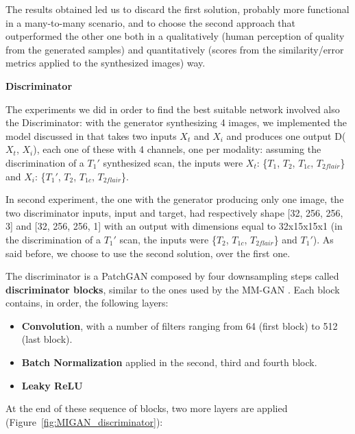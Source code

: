 \vspace{5mm} %
The results obtained led us to discard the first solution, probably more functional in a many-to-many scenario, and to choose the second approach that outperformed the other one both in a qualitatively (human perception of quality from the generated samples) and quantitatively (scores from the similarity/error metrics applied to the synthesized images) way.

\vspace{6mm} 
\noindent\textbf{Discriminator}

\vspace{2mm}
\noindent The experiments we did in order to find the best suitable network involved also the Discriminator: with the generator synthesizing 4 images, we implemented the model discussed in \cite{migan} that takes two inputs $X_t$ and $X_i$ and produces one output D($X_t$, $X_i$), each one of these with 4 channels, one per modality: assuming the discrimination of a $T_{1}'$ synthesized scan, the inputs were $X_t$: \{$T_{1}$, $T_{2}$, $T_{1c}$, $T_{2flair}$\} and $X_i$: \{$T_{1}'$, $T_{2}$, $T_{1c}$, $T_{2flair}$\}.

In second experiment, the one with the generator producing only one image, the two discriminator inputs, input and target, had respectively shape [32, 256, 256, 3] and [32, 256, 256, 1] with an output with dimensions equal to 32x15x15x1 (in the discrimination of a $T_{1}'$ scan, the inputs were \{$T_{2}$, $T_{1c}$, $T_{2flair}$\} and $T_{1}'$).
As said before, we choose to use the second solution, over the first one.

\vspace{5mm} %
The discriminator is a PatchGAN \cite{patchgan} composed by four downsampling steps called \textbf{discriminator blocks}, similar to the ones used by the MM-GAN {\cite{migan}}. Each block contains, in order, the following layers:

\begin{itemize}
\item \textbf{Convolution}, with a number of filters ranging from 64 (first block) to 512 (last block).
\item \textbf{Batch Normalization} applied in the second, third and fourth block.
\item \textbf{Leaky ReLU}
\end{itemize}

At the end of these sequence of blocks, two more layers are applied (Figure~\ref{fig:MIGAN_discriminator}):


